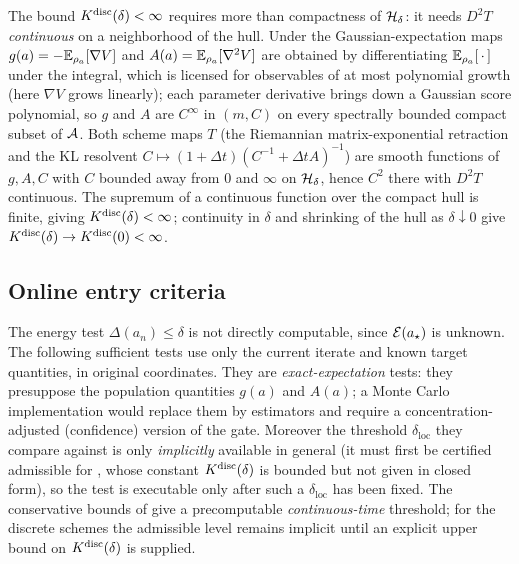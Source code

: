 \begin{remark}
\label{rem:Kdisc-finite}
The bound $K^{\mathrm{disc}}(\delta)<\infty$ requires more than compactness of $\mathcal{H}_\delta$: it needs
$D^2T$ \emph{continuous} on a neighborhood of the hull. Under  the
Gaussian-expectation maps $g(a)=-\mathbb{E}_{\rho_a}[\nabla V]$ and $A(a)=\mathbb{E}_{\rho_a}[\nabla^2V]$ are obtained
by differentiating $\mathbb{E}_{\rho_a}[\,\cdot\,]$ under the integral, which is licensed for observables of at
most polynomial growth (here $\nabla V$ grows linearly); each parameter derivative brings down a
Gaussian score polynomial, so $g$ and $A$ are $C^\infty$ in $(m,C)$ on every spectrally bounded compact
subset of $\mathcal{A}$. Both scheme maps $T$ (the Riemannian matrix-exponential retraction and the KL
resolvent $C\mapsto(1+\Delta t)(C^{-1}+\Delta t A)^{-1}$) are smooth functions of $g,A,C$ with $C$
bounded away from $0$ and $\infty$ on $\mathcal{H}_\delta$, hence $C^2$ there with $D^2T$ continuous. The
supremum of a continuous function over the compact hull is finite, giving $K^{\mathrm{disc}}(\delta)<\infty$;
continuity in $\delta$ and shrinking of the hull as $\delta\downarrow0$ give
$K^{\mathrm{disc}}(\delta)\to K^{\mathrm{disc}}(0)<\infty$.
\end{remark}

\subsection{Online entry criteria}
\label{subsec:entry}

The energy test $\Delta(a_n)\leq\delta$ is not directly computable, since $\mathcal{E}(a_\star)$ is
unknown. The following sufficient tests use only the current iterate and known target quantities,
in original coordinates. They are \emph{exact-expectation} tests: they presuppose the population
quantities $g(a)$ and $A(a)$; a Monte Carlo implementation would replace them by estimators and
require a concentration-adjusted (confidence) version of the gate. Moreover the threshold
$\delta_{\mathrm{loc}}$ they compare against is only \emph{implicitly} available in general (it must
first be certified admissible for , whose constant $K^{\mathrm{disc}}(\delta)$ is bounded
but not given in closed form), so the test is executable only after such a $\delta_{\mathrm{loc}}$
has been fixed. The conservative bounds of  give a precomputable
\emph{continuous-time} threshold; for the discrete schemes the admissible level remains implicit
until an explicit upper bound on $K^{\mathrm{disc}}(\delta)$ is supplied.

